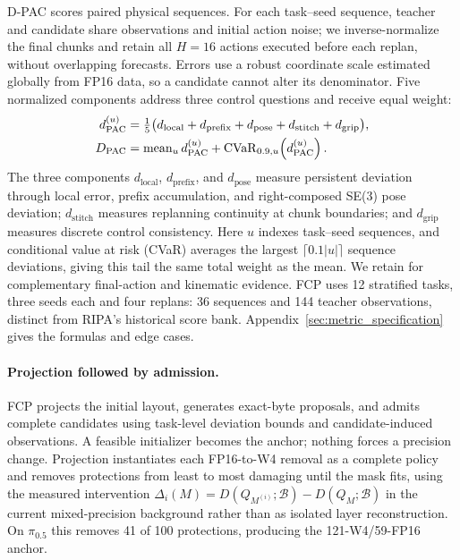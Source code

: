 D-PAC scores paired physical sequences. For each task--seed sequence, teacher and candidate share observations and initial action noise; we inverse-normalize the final chunks and retain all $H=16$ actions executed before each replan, without overlapping forecasts. Errors use a robust coordinate scale estimated globally from FP16 data, so a candidate cannot alter its denominator. Five normalized components address three control questions and receive equal weight:
\begin{equation}
 \begin{aligned}
 d_{\mathrm{PAC}}^{(u)}&=\tfrac{1}{5}\bigl(
 d_{\mathrm{local}}+d_{\mathrm{prefix}}+d_{\mathrm{pose}}+
 d_{\mathrm{stitch}}+d_{\mathrm{grip}}\bigr),\\
 D_{\mathrm{PAC}}&=\operatorname{mean}_u d_{\mathrm{PAC}}^{(u)}+
 \operatorname{CVaR}_{0.9,u}\!\left(d_{\mathrm{PAC}}^{(u)}\right).
 \end{aligned}
 \label{eq:dpac_sequence}
\end{equation}
The three components $d_{\mathrm{local}}$, $d_{\mathrm{prefix}}$, and $d_{\mathrm{pose}}$ measure persistent deviation through local error, prefix accumulation, and right-composed SE(3) pose deviation; $d_{\mathrm{stitch}}$ measures replanning continuity at chunk boundaries; and $d_{\mathrm{grip}}$ measures discrete control consistency. Here $u$ indexes task--seed sequences, and conditional value at risk (CVaR) averages the largest $\lceil0.1|u|\rceil$ sequence deviations, giving this tail the same total weight as the mean. We retain \dfunc for complementary final-action and kinematic evidence. FCP uses 12 stratified tasks, three seeds each and four replans: 36 sequences and 144 teacher observations, distinct from RIPA's historical score bank. Appendix~\ref{sec:metric_specification} gives the formulas and edge cases.

\paragraph{Projection followed by admission.}
FCP projects the initial layout, generates exact-byte proposals, and admits complete candidates using task-level deviation bounds and candidate-induced observations. A feasible initializer becomes the anchor; nothing forces a precision change. Projection instantiates each FP16-to-W4 removal as a complete policy and removes protections from least to most damaging until the mask fits, using the measured intervention $\Delta_i(M)=D(Q_{M^{(i)}};\mathcal B)-D(Q_M;\mathcal B)$ in the current mixed-precision background rather than as isolated layer reconstruction. On $\pi_{0.5}$ this removes 41 of 100 protections, producing the 121-W4/59-FP16 anchor.

